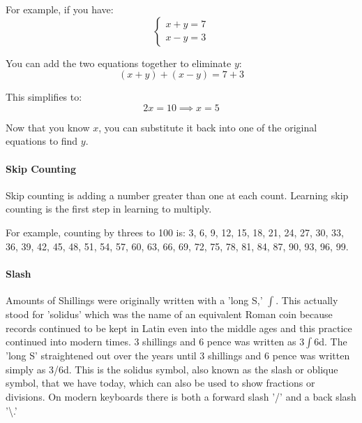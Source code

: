 \documentclass[12pt]{article}
\begin{document}
For example, if you have:
\[
\begin{cases}
x + y = 7 \\
x - y = 3
\end{cases}
\]

You can add the two equations together to eliminate \( y \):
\[
(x + y) + (x - y) = 7 + 3
\]

This simplifies to:
\[
2x = 10 \implies x = 5
\]

Now that you know \( x \), you can substitute it back into one of the original equations to find \( y \).\\

\paragraph{Skip Counting}
Skip counting is adding a number greater than one at each count. Learning skip counting is the first step in learning to multiply.

For example, counting by threes to 100 is: 3, 6, 9, 12, 15, 18, 21, 24, 27, 30, 33, 36, 39, 42, 45, 48, 51, 54, 57, 60, 63, 66, 69, 72, 75, 78, 81, 84, 87, 90, 93, 96, 99.

\begin{center}
\end{center}

\paragraph{Slash}
Amounts of Shillings were originally written with a 'long S,' $\int$. This actually stood for 'solidus' which was the name of an equivalent Roman coin because records continued to be kept in Latin even into the middle ages and this practice continued into modern times. 3 shillings and 6 pence was written as 3$\int$6d. The 'long S' straightened out over the years until 3 shillings and 6 pence was written simply as 3/6d. This is the solidus symbol, also known as the slash or oblique symbol, that we have today, which can also be used to show fractions or divisions. On modern keyboards there is both a forward slash '/' and a back slash '\textbackslash.'
\end{document}
